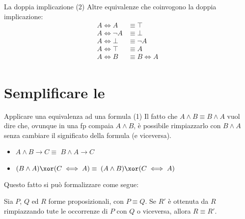 \documentclass[aspectratio=169,10pt,dvipsnames,handout]{beamer}
\begin{document}
\begin{frame}{La doppia implicazione (2)}
    Altre equivalenze che coinvogono la doppia implicazione:
    \begin{align*}
        A \iff A      & \equiv \top     \\
        A \iff \neg A & \equiv \bot     \\
        A \iff \bot   & \equiv \neg A   \\
        A \iff \top   & \equiv A        \\
        A \iff B      & \equiv B \iff A \\
    \end{align*}
\end{frame}


\section{Semplificare le \fp}

\begin{frame}{Applicare una equivalenza ad una formula (1)}
    Il fatto che $A \wedge B \equiv B \wedge A$ vuol dire che, ovunque in una fp compaia $A \wedge B$, è possibile rimpiazzarlo con $B \wedge A$ senza cambiare il significato della formula (e viceversa).
    \begin{itemize}
        \item $A \wedge B \to C \equiv$ \pause $B \wedge A \to C$ \pause\
        \item $(B \wedge A) \xor (C \iff A) \equiv$ \pause $(A \wedge B) \xor (C \iff A)$
    \end{itemize}

    \pause\medskip
    Questo fatto si può formalizzare come segue:
    \begin{theorem}
        Sia $P$, $Q$ ed $R$ forme proposizionali, con $P \equiv Q$. Se $R'$ è ottenuta da $R$ rimpiazzando tute le occorrenze di $P$ con $Q$ o viceversa, allora $R \equiv R'$.
    \end{theorem}
\end{frame}
\end{document}
